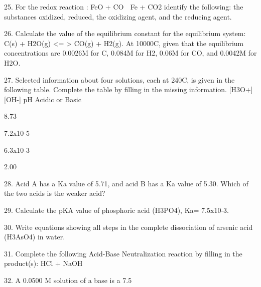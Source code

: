 \documentclass[addpoints, 12pt]{exam}
\begin{document}
\begin{questions}
25. For the redox reaction : FeO + CO  Fe + CO2  identify the following: the substances oxidized, reduced, the oxidizing agent, and the reducing agent.

26. Calculate the value of the equilibrium constant for the equilibrium system:                  C(s) + H2O(g) <= > CO(g) + H2(g).  At 10000C, given that the equilibrium concentrations are 0.0026M for C, 0.084M for H2, 0.06M for CO, and 0.0042M for H2O.



27. Selected information about four solutions, each at 240C, is given in the following table.  Complete the table by filling in the missing information.
[H3O+]
[OH-]
pH
Acidic or Basic


8.73


7.2x10-5


6.3x10-3





2.00




28. Acid A has a Ka value of 5.71, and acid B has a Ka value of 5.30.  Which of the two acids is the weaker acid?   

29. Calculate the pKA value of phosphoric acid (H3PO4), Ka= 7.5x10-3.


30. Write equations showing all steps in the complete dissociation of arsenic acid (H3AsO4) in water.




31. Complete the following Acid-Base Neutralization reaction by filling in the product(s):  HCl + NaOH %

32. A 0.0500 M solution of a base is a 7.5%


\end{questions}
\end{document}
